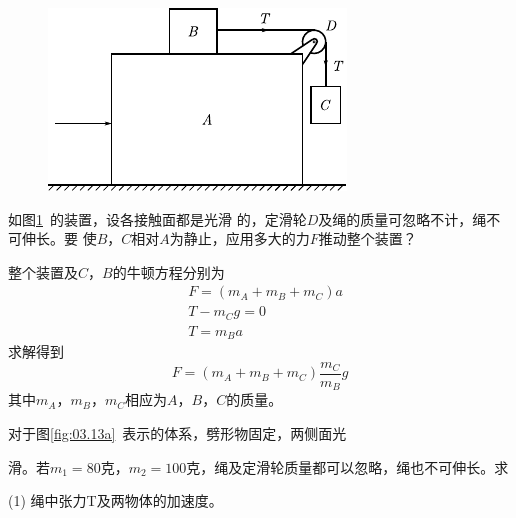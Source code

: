 \begin{figure}
    \centering
    \includegraphics{figure/fig03.12}
    \caption{}
    \label{fig:03.12}
\end{figure}
\example 如图\ref{fig:03.12}~的装置，设各接触面都是光滑
的，定滑轮$ D $及绳的质量可忽略不计，绳不可伸长。要
使$ B $，$ C $相对$ A $为静止，应用多大的力$ F $推动整个装置？

\solution 整个装置及$ C $，$ B $的牛顿方程分别为
\begin{align*}
	&F = ( m _{A} + m _ { B } + m _ { C } ) a \\[-0.5em]
	&T - m _ { C } g = 0 \\[-0.5em]
	&T = m _ { B } a
\end{align*}
求解得到\vspace{-1.56em}
\begin{equation*}
	F = ( m _ { A } + m _ { B } + m _ { C } ) \frac { m _ { C } } { m _ { B } } g
\end{equation*}
其中$ m_{A} $，$ m_{B} $，$ m_{C} $相应为$ A $，$ B $，$ C $的质量。


\example 对于图\ref{fig:03.13a}~表示的体系，劈形物固定，两侧面光

\noindent 滑。若$  m _ { 1 } = 8 0 \text{克} $，$ m _ { 2 } = 1 0 0 \text{克} $，绳及定滑轮质量都可以忽略，绳也不可伸长。求

(1) 绳中张力T及两物体的加速度。

